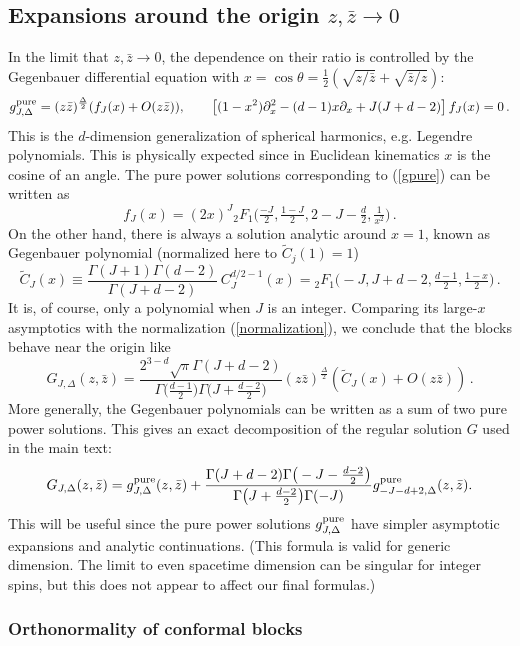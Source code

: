 \documentclass[11pt, reqno,preprint]{article}
\def\be{\begin{equation}}
\def\ee{\end{equation}}
\def\gpure{g^{\rm pure}}
\def\zbar{\bar{z}}
\def\j{J}
\begin{document}
\begin{appendix}
\subsection{Expansions around the origin $z,\zbar\to 0$}

In the limit that $z,\bar{z}\to 0$, the dependence on their ratio 
is controlled by the Gegenbauer differential equation with $x=\cos\theta=\frac12(\sqrt{z/\zbar}+\sqrt{\zbar/z})$:
\be
 \gpure_{\j,\Delta} = (z\zbar)^{\frac{\Delta}{2}}(f_\j(x) + O(z\zbar)),\qquad
\left[ (1-x^2)\partial_x^2 -(d-1)x\partial_x+\j(\j+d-2)\right]f_\j(x)=0\,.
\ee
This is the $d$-dimension generalization of spherical harmonics, e.g. Legendre polynomials.
This is physically expected since in Euclidean kinematics $x$ is the cosine of an angle.
The pure power solutions corresponding to (\ref{gpure})
can be written as
\be
 f_{\j}(x) = (2x)^{\j} {}_2F_1\big(\tfrac{-\j}{2},\tfrac{1-\j}{2},2-\j-\tfrac{d}2,\tfrac{1}{x^2}\big)\,. \label{fj_hyper}
\ee
On the other hand, there is always a solution analytic around $x=1$, known as Gegenbauer polynomial
(normalized here to $\tilde{C}_j(1)=1$)
\be
\tilde{C}_\j(x)\equiv \frac{\Gamma(\j+1)\Gamma(d-2)}{\Gamma(\j+d-2)}\,C^{d/2-1}_\j(x) =
{}_2F_1\big(-\j,\j+d-2,\tfrac{d-1}{2},\tfrac{1-x}{2}\big)\,.
 \label{gegen}
\ee
It is, of course, only a polynomial when $\j$ is an integer.
Comparing its large-$x$ asymptotics with the normalization (\ref{normalization}),
we conclude that the blocks behave near the origin like
\be
 G_{\j,\Delta}(z,\zbar) = \frac{2^{3-d}\sqrt{\pi}\Gamma(\j+d-2)}{\Gamma\big(\tfrac{d-1}{2}\big)\Gamma\big(\j+\tfrac{d-2}{2}\big)}
 (z\zbar)^{\frac{\Delta}{2}}\left( \tilde{C}_\j(x) + O(z\zbar)\right)\,. \label{G_gegen}
\ee
More generally, the Gegenbauer polynomials can be written as a sum of two pure power solutions.
This gives an exact decomposition of the regular solution $G$ used in the main text:
\be
 G_{\j,\Delta} (z,\zbar)= \gpure_{\j,\Delta}(z,\zbar) +
\frac{\Gamma(\j+d-2)\Gamma\big(-\j-\tfrac{d-2}{2}\big)}{\Gamma\big(\j+\tfrac{d-2}{2}\big)\Gamma(-\j)}
\gpure_{-\j-d+2,\Delta}(z,\zbar). \label{G_from_gpure}
\ee
This will be useful since the pure power solutions $\gpure_{\j,\Delta}$ have simpler asymptotic expansions
and analytic continuations.  (This formula is valid for generic dimension. The limit to even spacetime dimension can be singular
for integer spins, but this does not appear to affect our final formulas.)

\subsubsection*{Orthonormality of conformal blocks}\label{app:ortho}


\end{appendix}
\end{document}
